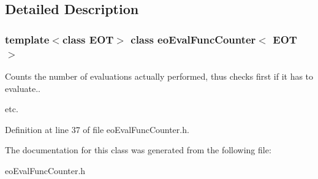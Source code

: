 \subsection{Detailed Description}
\subsubsection*{template$<$class EOT$>$ class eo\-Eval\-Func\-Counter$<$ EOT $>$}

Counts the number of evaluations actually performed, thus checks first if it has to evaluate.. 

etc. 



Definition at line 37 of file eo\-Eval\-Func\-Counter.h.

The documentation for this class was generated from the following file:\begin{CompactItemize}
\item 
eo\-Eval\-Func\-Counter.h\end{CompactItemize}
